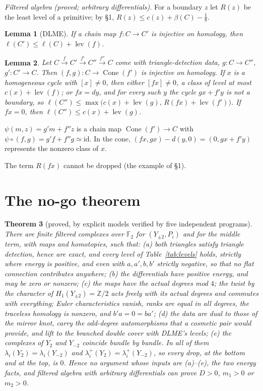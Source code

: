 \documentclass[10pt]{amsart}
\makeatletter
\numberwithin{equation}{section}
\theoremstyle{compact}
\newtheorem{theorem}{Theorem}[section]
\newtheorem{lemma}[theorem]{Lemma}
\theoremstyle{definition}
\renewenvironment{proof}[1][\proofname]{\par\pushQED{\qed}\normalfont
  \topsep4\p@\relax\trivlist\item[\hskip\labelsep\itshape#1\@addpunct{.}]%
  \ignorespaces}{\popQED\endtrivlist\@endpefalse}
\newcommand{\Z}{\mathbb Z}
\newcommand{\F}{\mathbb F}
\newcommand{\lev}{\operatorname{lev}}
\newcommand{\Cone}{\operatorname{Cone}}
\newcommand{\st}[1]{\par\noindent\textit{#1}\enspace}
\makeatother
\begin{document}
\st{Filtered algebra (proved; arbitrary differentials).} For a boundary $z$
let $R(z)$ be the least level of a primitive; by \S1,
$R(z)\le c(z)+\beta(C)-\frac18$.

\begin{lemma}[DLME]\label{lem:inj}
If a chain map $f\colon C\to C'$ is injective on homology, then
$\ell(C')\le\ell(C)+\lev(f)$.
\end{lemma}

\begin{lemma}\label{lem:vertex}
Let $C\xrightarrow{f}C'\xrightarrow{f'}C''\xrightarrow{f''}C$ come with
triangle-detection data, $g\colon C\to C''$, $g'\colon C'\to C$. Then
$(f,g)\colon C\to\Cone(f')$ is injective on homology. If $x$ is a
homogeneous cycle with $[x]\ne0$, then either $[fx]\ne0$, a class of level
at most $c(x)+\lev(f)$; or $fx=dy$, and for every such $y$ the cycle
$gx+f'y$ is not a boundary, so
$\ell(C'')\le\max\bigl(c(x)+\lev(g),\,R(fx)+\lev(f')\bigr)$. If $fx=0$,
then $\ell(C'')\le c(x)+\lev(g)$.
\end{lemma}

\begin{proof}
$\psi(m,z)=g'm+f''z$ is a chain map $\Cone(f')\to C$ with
$\psi\circ(f,g)=g'f+f''g\simeq\mathrm{id}$. In the cone,
$(fx,gx)-d(y,0)=(0,gx+f'y)$ represents the nonzero class of $x$.
\end{proof}

\noindent The term $R(fx)$ cannot be dropped (the example of \S1).

\section{The no-go theorem}\label{sec:nogo}

\begin{theorem}[proved, by explicit models verified by five independent programs]\label{thm:nogo}
There are finite filtered complexes over $\F_2$ for $(Y_{\pm2},P_i)$ and
for the middle term, with maps and homotopies, such that: (a) both
triangles satisfy triangle detection, hence are exact, and every level of
Table~\ref{tab:levels} holds, strictly where energy is positive, and even
with $a,a',b,b'$ strictly negative, so that no flat connection contributes
anywhere; (b) the differentials have positive energy, and may be zero or
nonzero; (c) the maps have the actual degrees mod $4$; the twist by the
character of $H_1(Y_{\pm2})=\Z/2$ acts freely with its actual degrees and
commutes with everything; Euler characteristics vanish, ranks are equal in
all degrees, the traceless homology is nonzero, and $b'a=0=ba'$; (d) the
data are dual to those of the mirror knot, carry the odd-degree
automorphisms that a cosmetic pair would provide, and lift to the branched
double cover with DLME's levels; (e) the complexes of $Y_2$ and $Y_{-2}$
coincide bundle by bundle. In all of them $\lambda_i(Y_2)=\lambda_i(Y_{-2})$
and $\lambda_i^+(Y_2)=\lambda^+_i(Y_{-2})$, so every drop, at the bottom and
at the top, is $0$. Hence no argument whose inputs are (a)--(e), the two
energy facts, and filtered algebra with arbitrary differentials can prove
$D>0$, $m_1>0$ or $m_2>0$.
\end{theorem}
\end{document}

